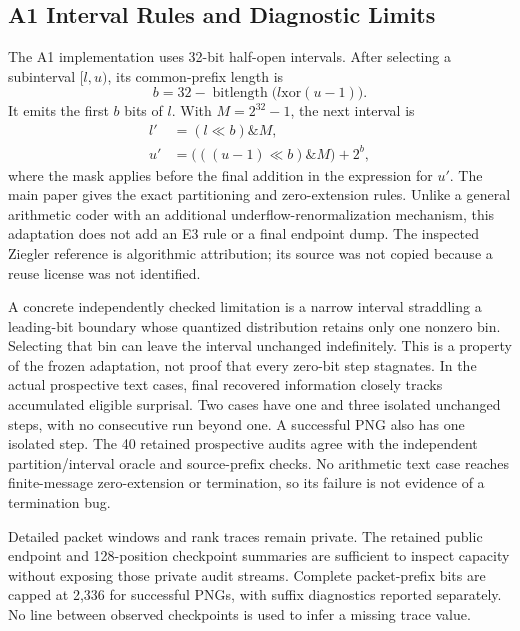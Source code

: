 \documentclass[a4paper,twoside]{article}
\begin{document}
\subsection{A1 Interval Rules and Diagnostic Limits}
The A1 implementation uses 32-bit half-open intervals. After selecting a subinterval $[l,u)$, its common-prefix length is
\begin{equation}
b=32-\operatorname{bitlength}\bigl(l\mathbin{\mathrm{xor}}(u-1)\bigr).
\end{equation}
It emits the first $b$ bits of $l$. With $M=2^{32}-1$, the next interval is
\begin{align}
l'&=(l\ll b)\mathbin{\&}M,\\
u'&=\bigl(((u-1)\ll b)\mathbin{\&}M\bigr)+2^b,
\end{align}
where the mask applies before the final addition in the expression for $u'$. The main paper gives the exact partitioning and zero-extension rules. Unlike a general arithmetic coder with an additional underflow-renormalization mechanism, this adaptation does not add an E3 rule or a final endpoint dump. The inspected Ziegler reference \cite{ziegler} is algorithmic attribution; its source was not copied because a reuse license was not identified.

A concrete independently checked limitation is a narrow interval straddling a leading-bit boundary whose quantized distribution retains only one nonzero bin. Selecting that bin can leave the interval unchanged indefinitely. This is a property of the frozen adaptation, not proof that every zero-bit step stagnates. In the actual prospective text cases, final recovered information closely tracks accumulated eligible surprisal. Two cases have one and three isolated unchanged steps, with no consecutive run beyond one. A successful PNG also has one isolated step. The 40 retained prospective audits agree with the independent partition/interval oracle and source-prefix checks. No arithmetic text case reaches finite-message zero-extension or termination, so its failure is not evidence of a termination bug.

Detailed packet windows and rank traces remain private. The retained public endpoint and 128-position checkpoint summaries are sufficient to inspect capacity without exposing those private audit streams. Complete packet-prefix bits are capped at 2,336 for successful PNGs, with suffix diagnostics reported separately. No line between observed checkpoints is used to infer a missing trace value.
\end{document}
